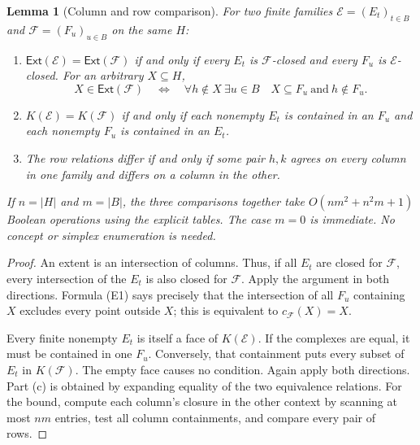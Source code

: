 \documentclass[11pt]{article}
\newtheorem{lemma}[theorem]{Lemma}
\theoremstyle{definition}
\newcommand{\Ext}{\mathsf{Ext}}
\begin{document}
\begin{lemma}[Column and row comparison]\label{lem:compare}
For two finite families $\mathcal E=(E_t)_{t\in B}$ and $\mathcal F=(F_u)_{u\in B}$ on the same $H$:
\begin{enumerate}[label=(\alph*)]
\item $\Ext(\mathcal E)=\Ext(\mathcal F)$ if and only if every $E_t$ is $\mathcal F$-closed and every $F_u$ is $\mathcal E$-closed. For an arbitrary $X\subseteq H$,
\[
 X\in\Ext(\mathcal F)\quad\Longleftrightarrow\quad
 \forall h\notin X\ \exists u\in B\quad X\subseteq F_u\ \text{and}\ h\notin F_u. \tag{E1}
\]
\item $K(\mathcal E)=K(\mathcal F)$ if and only if each nonempty $E_t$ is contained in an $F_u$ and each nonempty $F_u$ is contained in an $E_t$.
\item The row relations differ if and only if some pair $h,k$ agrees on every column in one family and differs on a column in the other.
\end{enumerate}
If $n=|H|$ and $m=|B|$, the three comparisons together take $O(nm^2+n^2m+1)$ Boolean operations using the explicit tables. The case $m=0$ is immediate. No concept or simplex enumeration is needed.
\end{lemma}
\begin{proof}
An extent is an intersection of columns. Thus, if all $E_t$ are closed for $\mathcal F$, every intersection of the $E_t$ is also closed for $\mathcal F$. Apply the argument in both directions. Formula (E1) says precisely that the intersection of all $F_u$ containing $X$ excludes every point outside $X$; this is equivalent to $c_{\mathcal F}(X)=X$.

Every finite nonempty $E_t$ is itself a face of $K(\mathcal E)$. If the complexes are equal, it must be contained in one $F_u$. Conversely, that containment puts every subset of $E_t$ in $K(\mathcal F)$. The empty face causes no condition. Again apply both directions. Part (c) is obtained by expanding equality of the two equivalence relations. For the bound, compute each column's closure in the other context by scanning at most $nm$ entries, test all column containments, and compare every pair of rows.
\end{proof}
\end{document}
